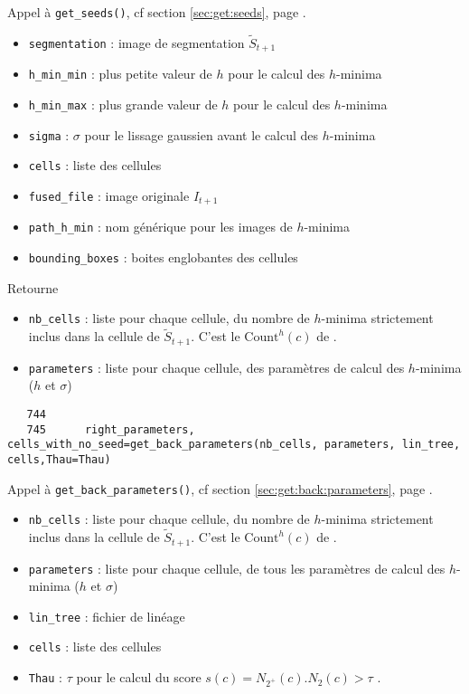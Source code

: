 \documentclass{article}
\def \mycolor {red}
\begin{document}
\color{\mycolor}
Appel \`a \texttt{get\_seeds()}, cf section \ref{sec:get:seeds}, page \pageref{sec:get:seeds}.
\begin{itemize}
\itemsep -0.5ex
\item \verb|segmentation| : image de segmentation $\tilde{S}_{t+1}$ 
\item \verb|h_min_min| : plus petite valeur de $h$ pour le calcul des $h$-minima
\item \verb|h_min_max| : plus grande valeur de $h$ pour le calcul des $h$-minima
\item \verb|sigma| : $\sigma$ pour le lissage gaussien avant le calcul des $h$-minima
\item \verb|cells| : liste des cellules
\item \verb|fused_file| : image originale $I_{t+1}$
\item \verb|path_h_min| : nom g\'en\'erique pour les images de $h$-minima
\item \verb|bounding_boxes| : boites englobantes des cellules
\end{itemize}
Retourne
\begin{itemize}
\itemsep -0.5ex
\item \verb|nb_cells| : liste pour chaque cellule, du nombre de $h$-minima strictement inclus dans la cellule de  $\tilde{S}_{t+1}$. C'est le $\mathrm{Count}^{h}(c)$ de \cite[section 2.3.3.5, page 71]{guignard:tel-01278725}.
\item \verb|parameters| : liste pour chaque cellule,  des param\`etres de calcul des $h$-minima ($h$ et $\sigma$)
\end{itemize}
\color{black}
\begin{verbatim}  
   744	  
   745	    right_parameters, cells_with_no_seed=get_back_parameters(nb_cells, parameters, lin_tree, cells,Thau=Thau)
\end{verbatim} 
\color{\mycolor}
Appel \`a \texttt{get\_back\_parameters()}, cf section \ref{sec:get:back:parameters}, page \pageref{sec:get:back:parameters}.
\begin{itemize}
\itemsep -0.5ex
\item \verb|nb_cells| : liste pour chaque cellule, du nombre de $h$-minima strictement inclus dans la cellule de  $\tilde{S}_{t+1}$. C'est le $\mathrm{Count}^{h}(c)$ de \cite[section 2.3.3.5, page 71]{guignard:tel-01278725}.
\item \verb|parameters| : liste pour chaque cellule,  de tous les param\`etres de calcul des $h$-minima ($h$ et $\sigma$)
\item \verb|lin_tree| : fichier de lin\'eage
\item \verb|cells| : liste des cellules
\item \verb|Thau| : $\tau$ pour le calcul du score $s(c) = N_{2^{+}}(c) . N_2(c) > \tau$ \cite[page 72]{guignard:tel-01278725}.
\end{itemize}
\end{document}

